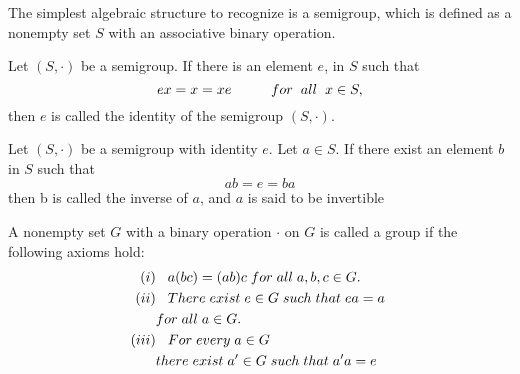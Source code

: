 The simplest algebraic structure to recognize is a semigroup, which is defined as a nonempty set $S$ with an associative binary operation.  

\begin{defi}
Let $(S,\cdot)$ be a semigroup. If there is an element $e$, in $S$ such that \begin{equation*}
    ex=x=xe \hspace{1cm} for \hspace{.2cm} all \hspace{.2cm} x\in S,
\end{equation*}
then $e$ is called the identity of the semigroup $(S,\cdot)$.
\end{defi}
\begin{defi}
    Let $(S,\cdot)$ be a semigroup with identity $e$. Let $a\in S$. If there exist an element $b$ in $S$ such that \begin{equation*}
        ab=e=ba
    \end{equation*}then b is called the inverse of $a$, and $a$ is said to be invertible
\end{defi}
\begin{defi}
    A nonempty set $G$ with a binary operation $\cdot$ on $G$ is called a group if the following axioms hold:
    \begin{align*}
        (i)&\hspace{.3cm} a(bc)=(ab)c \hspace{.1cm}for\hspace{.1cm}all\hspace{.1cm}a,b,c\in G.\\
        (ii)&\hspace{.3cm}There\hspace{.1cm}exist\hspace{.1cm}e\in G \hspace{.1cm}such\hspace{.1cm} that\hspace{.1cm} ea=a\hspace{.1cm}\\ &for\hspace{.1cm}all\hspace{.1cm}a\in G.\\
        (iii)&\hspace{.3cm}For\hspace{.1cm}every\hspace{.1cm}a\in G\hspace{.1cm}\\
        &there\hspace{.1cm}exist\hspace{.1cm}a'\in G\hspace{.1cm}such\hspace{.1cm}that\hspace{.1cm}a'a=e
    \end{align*}
\end{defi}

